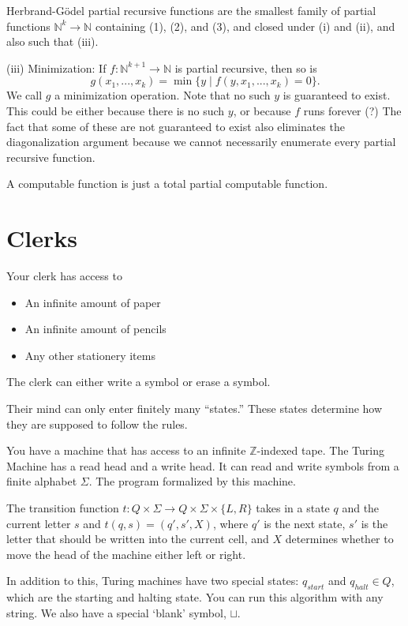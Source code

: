 Herbrand-Gödel partial recursive functions are the smallest family of partial functions $\mathbb {N}^k \to \mathbb{N}$ containing (1), (2), and (3), and closed under (i) and (ii), and also such that (iii).

(iii) Minimization: If $f : \mathbb N ^{k+1} \to \mathbb N$ is partial recursive, then so is 
$$g(x_1, ..., x_k) = 
\min\{y \;|\; f(y, x_1, ..., x_k) = 0\}.$$
We call $g$ a minimization operation.
Note that no such $y$ is guaranteed to exist.
This could be either because there is no such $y$, or because $f$ runs forever (?)
The fact that some of these are not guaranteed to exist also eliminates the diagonalization argument because we cannot necessarily enumerate every partial recursive function.

A computable function is just a total partial computable function.

\section{Clerks}
Your clerk has access to
\begin{itemize}
    \item An infinite amount of paper
    \item An infinite amount of pencils
    \item Any other stationery items
\end{itemize}
The clerk can either write a symbol or erase a symbol.

Their mind can only enter finitely many ``states.''
These states determine how they are supposed to follow the rules.

You have a machine that has access to an infinite $\mathbb Z$-indexed tape.
The Turing Machine has a read head and a write head.
It can read and write symbols from a finite alphabet $\Sigma$.
The program formalized by this machine.

The transition function $t: Q \times \Sigma \to Q \times \Sigma \times \{L, R\}$ takes in a state $q$ and the current letter $s$ and 
$t(q, s) = (q', s', X)$, where $q'$ is the next state, $s'$ is the letter that should be written into the current cell, and $X$ determines whether to move the head of the machine either left or right.

In addition to this, Turing machines have two special states: $q_{start}$ and $q_{halt} \in Q$, which are the starting and halting state.
You can run this algorithm with any string.
We also have a special `blank' symbol, $\sqcup$.


